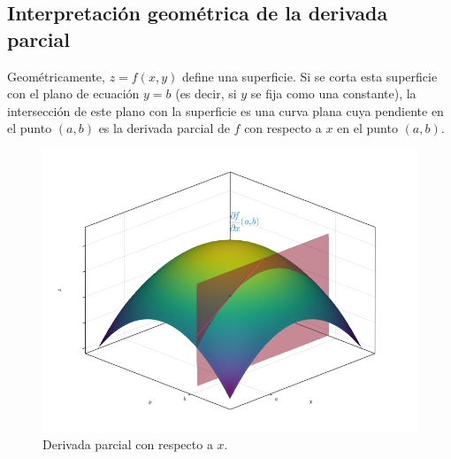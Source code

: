 \documentclass[
  a4paper,
]{scrreport}
\theoremstyle{definition}
\theoremstyle{plain}
\theoremstyle{plain}
\theoremstyle{definition}
\theoremstyle{definition}
\theoremstyle{plain}
\theoremstyle{remark}
\begin{document}
\hypertarget{interpretaciuxf3n-geomuxe9trica-de-la-derivada-parcial}{%
\subsection{Interpretación geométrica de la derivada
parcial}\label{interpretaciuxf3n-geomuxe9trica-de-la-derivada-parcial}}

Geométricamente, \(z=f(x,y)\) define una superficie. Si se corta esta
superficie con el plano de ecuación \(y=b\) (es decir, si \(y\) se fija
como una constante), la intersección de este plano con la superficie es
una curva plana cuya pendiente en el punto \((a,b)\) es la derivada
parcial de \(f\) con respecto a \(x\) en el punto \((a,b)\).

\begin{figure}

{\centering \includegraphics{./img/derivadas-funciones-varias-variables/derivada-parcial-x.png}

}

\caption{Derivada parcial con respecto a \(x\).}

\end{figure}
\end{document}
